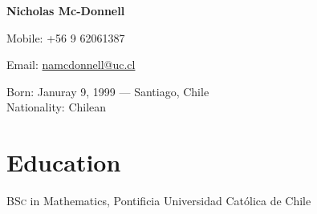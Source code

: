 \documentclass[11pt]{article} %
\begin{document}

{\LARGE\bfseries Nicholas Mc-Donnell} %
\bigskip\bigskip\medskip %


Mobile: +56 9 62061387 %
\medskip %

Email: \href{mailto:namcdonnell@uc.cl}{namcdonnell@uc.cl}\\ %

\vspace{0.06\textheight} %


Born: Januray 9, 1999 --- Santiago, Chile\\ %
Nationality: Chilean %




\section*{Education}

\textsc{BSc} in Mathematics, Pontificia Universidad Católica de Chile





\end{document}
